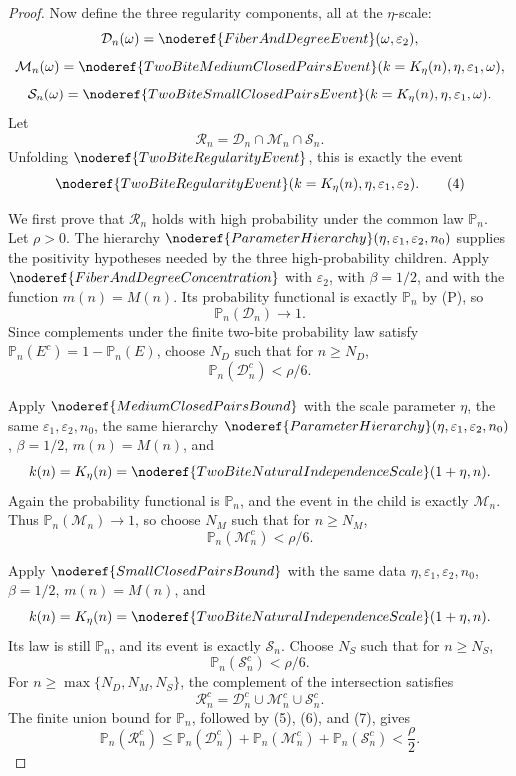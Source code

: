 \begin{proof}
Now define the three regularity components, all at the \(\eta\)-scale:
\[
\mathcal D_n(\omega)=\noderef{FiberAndDegreeEvent}(\omega,\varepsilon_2),
\]
\[
\mathcal M_n(\omega)=
\noderef{TwoBiteMediumClosedPairsEvent}(k=K_\eta(n),\eta,\varepsilon_1,\omega),
\]
\[
\mathcal S_n(\omega)=
\noderef{TwoBiteSmallClosedPairsEvent}(k=K_\eta(n),\eta,\varepsilon_1,\omega).
\]
Let
\[
\mathcal R_n=\mathcal D_n\cap\mathcal M_n\cap\mathcal S_n.
\]
Unfolding \(\noderef{TwoBiteRegularityEvent}\), this is exactly the event
\[
\noderef{TwoBiteRegularityEvent}
(k=K_\eta(n),\eta,\varepsilon_1,\varepsilon_2).
\tag{4}
\]

We first prove that \(\mathcal R_n\) holds with high probability under the
common law \(\mathbb P_n\).  Let \(\rho>0\).  The hierarchy
\(\noderef{ParameterHierarchy}(\eta,\varepsilon_1,\varepsilon_2,n_0)\) supplies
the positivity hypotheses needed by the three high-probability children.  Apply
\(\noderef{FiberAndDegreeConcentration}\) with \(\varepsilon_2\), with
\(\beta=1/2\), and with the function \(m(n)=M(n)\).  Its probability functional
is exactly \(\mathbb P_n\) by (P), so
\[
\mathbb P_n(\mathcal D_n)\to1.
\]
Since complements under the finite two-bite probability law satisfy
\(\mathbb P_n(E^c)=1-\mathbb P_n(E)\), choose \(N_D\) such that for
\(n\ge N_D\),
\[
\mathbb P_n(\mathcal D_n^c)<\rho/6. \tag{5}
\]

Apply \(\noderef{MediumClosedPairsBound}\) with the scale parameter
\(\eta\), the same \(\varepsilon_1,\varepsilon_2,n_0\), the same hierarchy
\(\noderef{ParameterHierarchy}(\eta,\varepsilon_1,\varepsilon_2,n_0)\),
\(\beta=1/2\), \(m(n)=M(n)\), and
\[
k(n)=K_\eta(n)=\noderef{TwoBiteNaturalIndependenceScale}(1+\eta,n).
\]
Again the probability functional is \(\mathbb P_n\), and the event in the child
is exactly \(\mathcal M_n\).  Thus \(\mathbb P_n(\mathcal M_n)\to1\), so choose
\(N_M\) such that for \(n\ge N_M\),
\[
\mathbb P_n(\mathcal M_n^c)<\rho/6. \tag{6}
\]

Apply \(\noderef{SmallClosedPairsBound}\) with the same data
\(\eta,\varepsilon_1,\varepsilon_2,n_0\), \(\beta=1/2\), \(m(n)=M(n)\), and
\[
k(n)=K_\eta(n)=\noderef{TwoBiteNaturalIndependenceScale}(1+\eta,n).
\]
Its law is still \(\mathbb P_n\), and its event is exactly \(\mathcal S_n\).
Choose \(N_S\) such that for \(n\ge N_S\),
\[
\mathbb P_n(\mathcal S_n^c)<\rho/6. \tag{7}
\]
For \(n\ge\max\{N_D,N_M,N_S\}\), the complement of the intersection satisfies
\[
\mathcal R_n^c
=\mathcal D_n^c\cup\mathcal M_n^c\cup\mathcal S_n^c.
\]
The finite union bound for \(\mathbb P_n\), followed by (5), (6), and (7), gives
\[
\mathbb P_n(\mathcal R_n^c)
\le
\mathbb P_n(\mathcal D_n^c)+\mathbb P_n(\mathcal M_n^c)+
\mathbb P_n(\mathcal S_n^c)
<\frac{\rho}{2}. \tag{8}
\]


\end{proof}

